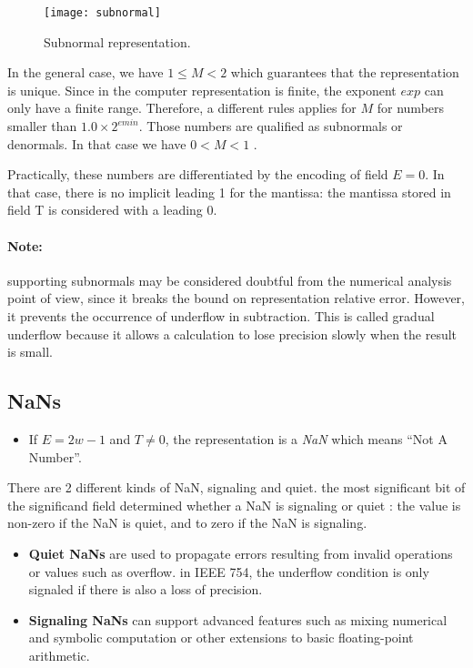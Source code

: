 \begin{figure}[h!]
  \centering
  \texttt{[image: subnormal]}
  \caption{Subnormal representation.}
  \label{sybnormals}
\end{figure}

In the general case, we have $ 1 \leq M < 2 $ which guarantees that the representation is unique.
Since in the computer representation is finite, the exponent $exp$ can only have a finite range.  Therefore, a different rules applies for $M$ for numbers smaller than $ 1.0 \times 2^{emin}$. Those numbers are qualified as subnormals or denormals. In that case we have $ 0 < M < 1$ .

Practically, these numbers are differentiated by the encoding of field $E=0$. In that case, there is no implicit leading 1 for the mantissa:  the mantissa  stored in field T is considered with a leading 0.

\paragraph{Note:} supporting subnormals may be considered doubtful from the numerical analysis point of view, since it breaks the bound on representation relative error. However, it prevents the occurrence of underflow in subtraction. This is called gradual underflow because it allows a calculation to lose precision slowly when the result is small.

\subsection{NaNs}
\begin{itemize}[topsep=0pt]
\item If $E=2w-1$ and $T\neq 0$, the representation is a \emph{NaN} which means ``Not A Number''.
\end{itemize}
There are 2 different kinds of NaN, signaling and quiet. the most significant bit of the significand field determined whether a NaN is signaling or quiet : the value is non-zero if the NaN is quiet, and to zero if the NaN is signaling. \\
\begin{itemize}[topsep=0pt]
\item \textbf{Quiet NaNs} are used to propagate errors resulting from invalid operations or values such as overflow.
in IEEE 754, the underflow condition is only signaled if there is also a loss of precision.
\item \textbf{Signaling NaNs} can support advanced features such as mixing numerical and symbolic computation or other extensions to basic floating-point arithmetic.
\end{itemize}
